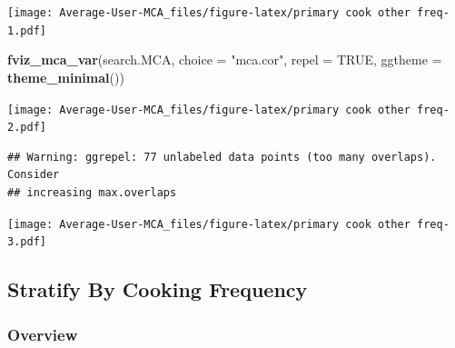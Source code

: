 \documentclass[
]{article}
\newenvironment{Shaded}{\begin{snugshade}}{\end{snugshade}}
\newcommand{\DataTypeTok}[1]{\textcolor[rgb]{0.13,0.29,0.53}{#1}}
\newcommand{\KeywordTok}[1]{\textcolor[rgb]{0.13,0.29,0.53}{\textbf{#1}}}
\newcommand{\NormalTok}[1]{#1}
\newcommand{\OtherTok}[1]{\textcolor[rgb]{0.56,0.35,0.01}{#1}}
\newcommand{\StringTok}[1]{\textcolor[rgb]{0.31,0.60,0.02}{#1}}
\begin{document}
\texttt{[image: Average-User-MCA\_files/figure-latex/primary cook other freq-1.pdf]}

\begin{Shaded}
\begin{Highlighting}[]
\KeywordTok{fviz_mca_var}\NormalTok{(search.MCA, }\DataTypeTok{choice =} \StringTok{"mca.cor"}\NormalTok{, }\DataTypeTok{repel =} \OtherTok{TRUE}\NormalTok{,}
             \DataTypeTok{ggtheme =} \KeywordTok{theme_minimal}\NormalTok{())}
\end{Highlighting}
\end{Shaded}

\texttt{[image: Average-User-MCA\_files/figure-latex/primary cook other freq-2.pdf]}

\begin{Shaded}
\end{Shaded}

\begin{verbatim}
## Warning: ggrepel: 77 unlabeled data points (too many overlaps). Consider
## increasing max.overlaps
\end{verbatim}

\texttt{[image: Average-User-MCA\_files/figure-latex/primary cook other freq-3.pdf]}

\hypertarget{stratify-by-cooking-frequency}{%
\subsection{Stratify By Cooking
Frequency}\label{stratify-by-cooking-frequency}}

\hypertarget{overview-1}{%
\subsubsection{Overview}\label{overview-1}}
\end{document}
